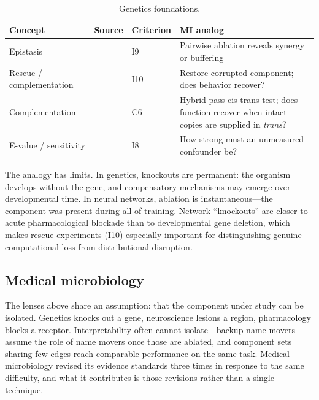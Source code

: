 \documentclass{article}
\begin{document}
\begin{table}[H]
\centering\small
\caption{Genetics foundations.}
\renewcommand{\arraystretch}{1.12}
\begin{tabular}{@{}l>{\raggedright\arraybackslash}p{2.2cm}l>{\raggedright\arraybackslash}p{4.5cm}@{}}
\toprule
\textbf{Concept} & \textbf{Source} & \textbf{Criterion} & \textbf{MI analog} \\
\midrule
Epistasis & \citet{fisher1918correlation} & I9 & Pairwise ablation reveals synergy or buffering \\
\midrule
Rescue / complementation & \citet{brenner1974genetics} & I10 & Restore corrupted component; does behavior recover? \\
\midrule
Complementation & \citet{benzer1955fine} & C6 & Hybrid-pass cis-trans test; does function recover when intact copies are supplied in \emph{trans}? \\
\midrule
E-value / sensitivity & \citet{vanderweele2017sensitivity} & I8 & How strong must an unmeasured confounder be? \\
\bottomrule
\end{tabular}
\end{table}

The analogy has limits. In genetics, knockouts are permanent: the organism develops without the gene, and compensatory mechanisms may emerge over developmental time. In neural networks, ablation is instantaneous---the component was present during all of training. Network ``knockouts'' are closer to acute pharmacological blockade than to developmental gene deletion, which makes rescue experiments (I10) especially important for distinguishing genuine computational loss from distributional disruption.


\subsection{Medical microbiology}
\label{sec:microbiology}

The lenses above share an assumption: that the component under study can be isolated. Genetics knocks out a gene, neuroscience lesions a region, pharmacology blocks a receptor. Interpretability often cannot isolate---backup name movers assume the role of name movers once those are ablated, and component sets sharing few edges reach comparable performance on the same task. Medical microbiology revised its evidence standards three times in response to the same difficulty, and what it contributes is those revisions rather than a single technique.
\end{document}
